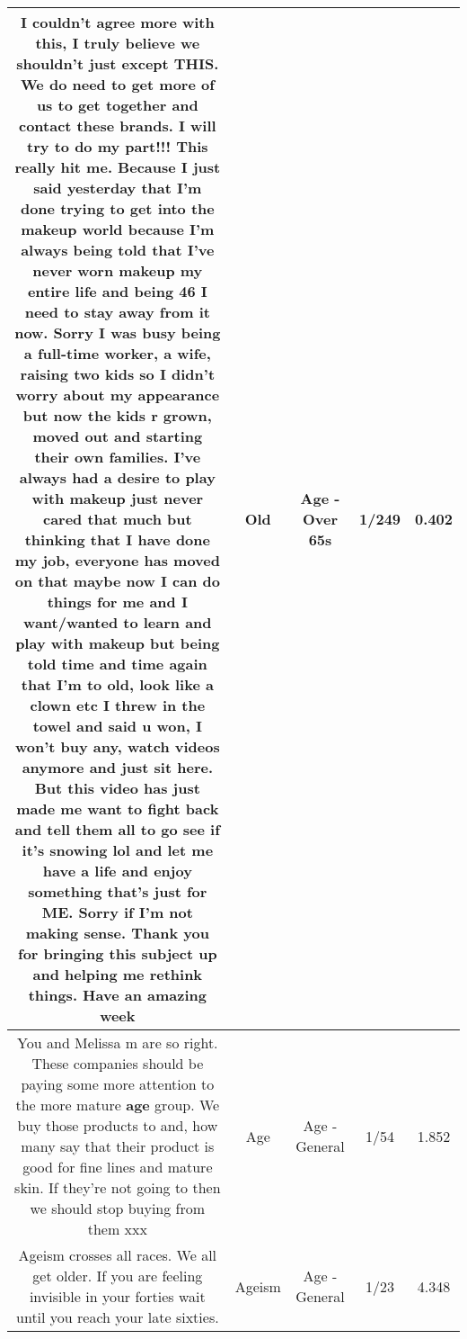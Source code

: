 \documentclass[11pt]{article}
\newlength\mylength
\begin{document}
\begin{center}
\begin{longtable}{|C{.65\mylength}|C{.30\mylength}|C{.12\mylength}|C{.12\mylength}|C{.12\mylength}|}
  \small I couldn't agree more with this, I truly believe we shouldn't just except THIS. We do need to get more of us to get together and contact these brands. I will try to do my part!!! This really hit me. Because I just said yesterday that I'm done trying to get into the makeup world because I'm always being told that I've never worn makeup my entire life and being 46 I need to stay away from it now.  Sorry I was busy being a full-time worker, a wife, raising two kids so I didn't worry about my appearance but now the kids r grown, moved out and starting their own families.  I've always had a desire to play with makeup just never cared that much but thinking that I have done my job, everyone has moved on that maybe now I can do things for me and I want/wanted to learn and play with makeup but being told time and time again that I'm to \textbf{old}, look like a clown etc I threw in the towel and said u won, I won't buy any, watch videos anymore and just sit here. But this video has just made me want to fight back and tell them all to go see if it's snowing lol and let me have a life and enjoy something that's just for ME. Sorry if I'm not making sense. Thank you for bringing this subject up and helping me rethink things. Have an amazing week\normalsize   & Old & Age - Over 65s & 1/249 & 0.402 \\  \hline
  \small You and Melissa m are so right. These companies should be paying some more attention to the more mature \textbf{age} group. We buy those products to and, how many say that their product is good for fine lines and mature skin. If they're not going to then we should stop buying from them xxx\normalsize   & Age & Age - General & 1/54 & 1.852 \\  \hline
  \small Ageism crosses all races. We all get older. If you are feeling invisible in your forties wait until you reach your late sixties.\normalsize   & Ageism & Age - General & 1/23 & 4.348 \\  \hline

\end{longtable}
\end{center}
\end{document}
